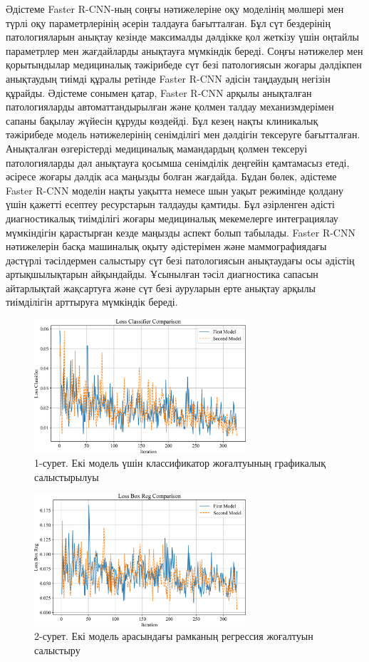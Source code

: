 \begin{multicols}{2}
Әдістеме Faster R-CNN-ның соңғы нәтижелеріне оқу моделінің мөлшері мен
түрлі оқу параметрлерінің әсерін талдауға бағытталған. Бұл сүт
бездерінің патологияларын анықтау кезінде максималды дәлдікке қол
жеткізу үшін оңтайлы параметрлер мен жағдайларды анықтауға мүмкіндік
береді. Соңғы нәтижелер мен қорытындылар медициналық тәжірибеде сүт безі
патологиясын жоғары дәлдікпен анықтаудың тиімді құралы ретінде Faster
R-CNN әдісін таңдаудың негізін құрайды. Әдістеме сонымен қатар, Faster
R-CNN арқылы анықталған патологияларды автоматтандырылған және қолмен
талдау механизмдерімен сапаны бақылау жүйесін құруды көздейді. Бұл кезең
нақты клиникалық тәжірибеде модель нәтижелерінің сенімділігі мен
дәлдігін тексеруге бағытталған. Анықталған өзгерістерді медициналық
мамандардың қолмен тексеруі патологияларды дәл анықтауға қосымша
сенімділік деңгейін қамтамасыз етеді, әсіресе жоғары дәлдік аса маңызды
болған жағдайда. Бұдан бөлек, әдістеме Faster R-CNN моделін нақты
уақытта немесе шын уақыт режимінде қолдану үшін қажетті есептеу
ресурстарын талдауды қамтиды. Бұл әзірленген әдісті диагностикалық
тиімділігі жоғары медициналық мекемелерге интеграциялау мүмкіндігін
қарастырған кезде маңызды аспект болып табылады. Faster R-CNN
нәтижелерін басқа машиналық оқыту әдістерімен және маммографиядағы
дәстүрлі тәсілдермен салыстыру сүт безі патологиясын анықтаудағы осы
әдістің артықшылықтарын айқындайды. Ұсынылған тәсіл диагностика сапасын
айтарлықтай жақсартуға және сүт безі ауруларын ерте анықтау арқылы
тиімділігін арттыруға мүмкіндік береді.
\end{multicols}

\begin{figure}[H]
	\centering
	\includegraphics[width=0.7\textwidth]{media/ict/image23}
	\caption*{1-сурет. Екі модель үшін классификатор жоғалтуының графикалық
салыстырылуы}
\end{figure}
\begin{figure}[H]
	\centering
	\includegraphics[width=0.7\textwidth]{media/ict/image24}
	\caption*{2-сурет. Екі модель арасындағы рамканың регрессия жоғалтуын
салыстыру}
\end{figure}

